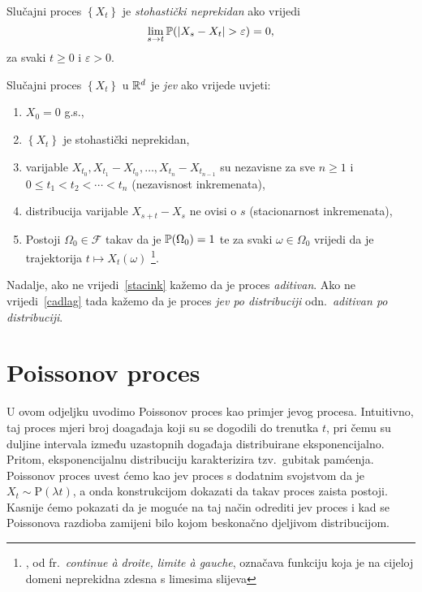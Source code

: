 \documentclass[main.tex]{subfiles}
\begin{document}
\begin{definicija}
	Slučajni proces \( \left\{ X_t \right\} \) je \emph{stohastički neprekidan} ako vrijedi
	\begin{equation} \label{def:stohnep}
		\lim\limits_{s \rightarrow t} \P (\abs{X_s - X_t} > \varepsilon)  = 0,
	\end{equation}
	za svaki \( t \ge 0 \) i \( \varepsilon > 0 \).
\end{definicija}

\begin{definicija}
	Slučajni proces \( \left\{ X_t \right\} \) u \( \R^d \) je \emph{\levy jev} ako vrijede uvjeti:
	\begin{enumerate}[label=(\roman*)]
		\item \( X_0 = 0 \) g.s.,
		\item \( \left\{ X_t \right\} \) je stohastički neprekidan,
		\item varijable \( X_{t_0}, X_{t_1}-X_{t_0}, \ldots ,X_{t_n}-X_{t_{n-1}} \) su nezavisne za sve \( n \ge 1 \) i \(0 \le t_1 < t_2 < \cdots < t_n \) (nezavisnost inkremenata),
		\item distribucija varijable \( X_{s+t}-X_s \) ne ovisi o \( s \) (stacionarnost inkremenata), \label{stacink}
		\item Postoji \( \Omega_0 \in \mathcal F \) takav da je \( \P(\Omega_0) = 1 \) te za svaki \( \omega \in \Omega_0 \) vrijedi da je trajektorija
		      \( t \mapsto X_t(\omega) \) \cadlag\footnote{\cadlag, od fr.\ \textit{continue à droite, limite à gauche}, označava funkciju koja je na cijeloj domeni neprekidna zdesna s limesima slijeva}. \label{cadlag}
	\end{enumerate}
	Nadalje, ako ne vrijedi~\ref{stacink} kažemo da je proces \emph{aditivan}. Ako ne vrijedi~\ref{cadlag} tada kažemo da je proces \emph{\levy jev po distribuciji} odn.\
	\emph{aditivan po distribuciji}.
\end{definicija}

\section{Poissonov proces}\label{sec:sp-poisson}
U ovom odjeljku uvodimo Poissonov proces kao primjer \levy jevog procesa. Intuitivno, taj proces mjeri broj doagađaja koji su se dogodili do
trenutka \( t \), pri čemu su duljine intervala između uzastopnih događaja distribuirane eksponencijalno. Pritom, eksponencijalnu distribuciju karakterizira
tzv.\ gubitak pamćenja. Poissonov proces uvest ćemo kao \levy jev proces s dodatnim svojstvom da je \( X_t \sim \mathrm P(\lambda t) \), a onda konstrukcijom
dokazati da takav proces zaista postoji. Kasnije ćemo pokazati da je moguće na taj način odrediti \levy jev proces i kad se Poissonova razdioba zamijeni
bilo kojom beskonačno djeljivom distribucijom.
\end{document}
